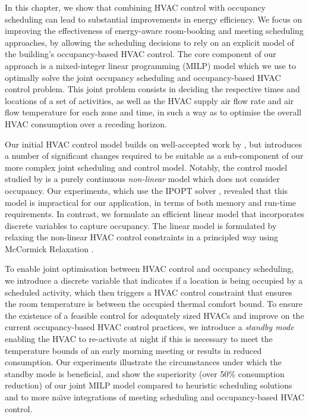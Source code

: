 
In this chapter, we show that combining HVAC control with occupancy scheduling can lead to substantial improvements in energy efficiency. 
We focus on improving the effectiveness of energy-aware room-booking and meeting scheduling approaches, by allowing the scheduling decisions to rely on an explicit model of the building's occupancy-based HVAC control. The core component of our approach is a mixed-integer linear programming (MILP) model which we use to optimally solve the joint occupancy scheduling and occupancy-based HVAC control problem. This joint problem consists in deciding the respective times and locations of a set of activities, as well as the HVAC supply air flow rate and air flow temperature for each zone and time, in such a way as to optimise the overall HVAC consumption over a receding horizon.

Our initial HVAC control model builds on well-accepted work by \cite{goyal2013occupancy}, but introduces a number of significant changes required to be suitable as a sub-component of our more complex joint scheduling and control model. Notably, the control model studied by \cite{goyal2013occupancy} is a purely continuous {\em non-linear} model which does not consider occupancy. Our experiments, which use the IPOPT solver \citep{Ipopt}, revealed that this model is impractical for our application, in terms of both memory and run-time requirements. In contrast, we formulate an efficient linear model that incorporates discrete variables to capture occupancy. %
The linear model is formulated by relaxing the non-linear HVAC control constraints in a principled way using McCormick Relaxation \citep{mccormick1976computability}. 

To enable joint optimisation between HVAC control and occupancy scheduling, we introduce a discrete variable that indicates if a location is being occupied by a scheduled activity, which then triggers a HVAC control constraint that ensures the room temperature is between the occupied thermal comfort bound. To ensure the existence of a feasible control for adequately sized HVACs and improve on the current occupancy-based HVAC control practices, we introduce a \textsl{standby mode} enabling the HVAC to re-activate at night if this is necessary to meet the temperature bounds of an early morning meeting or results in reduced consumption. Our experiments illustrate the circumstances under which the standby mode is beneficial, and show the superiority (over 50\% consumption reduction) of our joint MILP model compared to heuristic scheduling solutions and to more na\"{\i}ve integrations of meeting scheduling and occupancy-based HVAC control. 

